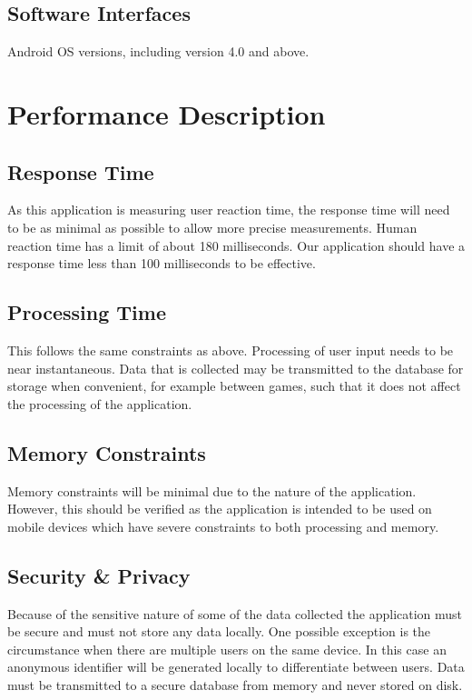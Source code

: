 \documentclass[a4wide]{article}
\begin{document}
\subsection{Software Interfaces}

Android OS versions, including version 4.0 and above.



\section{Performance Description}

\subsection{Response Time}
As this application is measuring user reaction time, the response time will need
to be as minimal as possible to allow more precise measurements.  Human reaction
time has a limit of about 180 milliseconds.  Our application should have a
response time less than 100 milliseconds to be effective.

\subsection{Processing Time}
This follows the same constraints as above.  Processing of user input needs to
be near instantaneous.  Data that is collected may be transmitted to the
database for storage when convenient, for example between games, such that it
does not affect the processing of the application.

\subsection{Memory Constraints}
Memory constraints will be minimal due to the nature of the application.
However, this should be verified as the application is intended to be used on
mobile devices which have severe constraints to both processing and memory.

\subsection{Security \& Privacy}
Because of the sensitive nature of some of the data collected the application
must be secure and must not store any data locally.  One possible exception is
the circumstance when there are multiple users on the same device.  In this case
an anonymous identifier will be generated locally to differentiate between
users.  Data must be transmitted to a secure database from memory and never
stored on disk.
\end{document}
